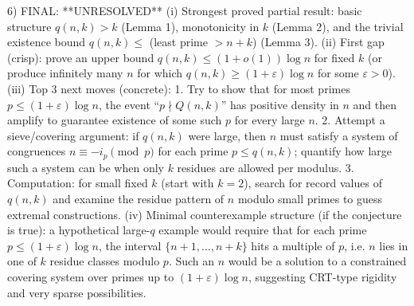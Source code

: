 6) FINAL: **UNRESOLVED**
(i) Strongest proved partial result: basic structure $q(n,k)>k$ (Lemma 1), monotonicity in $k$ (Lemma 2), and the trivial existence bound $q(n,k)\le$ (least prime $>n+k$) (Lemma 3).
(ii) First gap (crisp): prove an upper bound $q(n,k)\le (1+o(1))\log n$ for fixed $k$ (or produce infinitely many $n$ for which $q(n,k)\ge (1+\varepsilon)\log n$ for some $\varepsilon>0$).
(iii) Top 3 next moves (concrete):
  1. Try to show that for most primes $p\le (1+\varepsilon)\log n$, the event ``$p\nmid Q(n,k)$'' has positive density in $n$ and then amplify to guarantee existence of some such $p$ for every large $n$.
  2. Attempt a sieve/covering argument: if $q(n,k)$ were large, then $n$ must satisfy a system of congruences $n\equiv -i_p\pmod p$ for each prime $p\le q(n,k)$; quantify how large such a system can be when only $k$ residues are allowed per modulus.
  3. Computation: for small fixed $k$ (start with $k=2$), search for record values of $q(n,k)$ and examine the residue pattern of $n$ modulo small primes to guess extremal constructions.
(iv) Minimal counterexample structure (if the conjecture is true): a hypothetical large-$q$ example would require that for each prime $p\le (1+\varepsilon)\log n$, the interval $\{n+1,\ldots,n+k\}$ hits a multiple of $p$, i.e. $n$ lies in one of $k$ residue classes modulo $p$. Such an $n$ would be a solution to a constrained covering system over primes up to $(1+\varepsilon)\log n$, suggesting CRT-type rigidity and very sparse possibilities.
